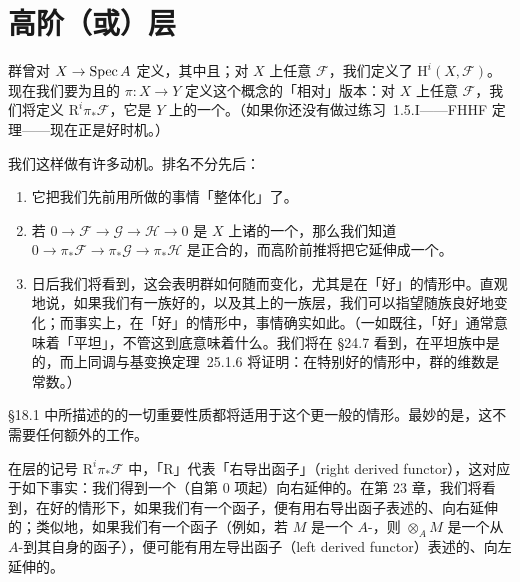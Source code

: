 
\section{高阶\trPushforward（或\trDirectImage）层}

\trCohomology{}群曾对 $X\to\operatorname{Spec} A$ 定义，其中\trStructureMorphism{}\trQuasicompact{}且\trSeparated；对 $X$ 上任意\trQCSheaf{} $\mathscr{F}$，我们定义了 $\mathrm{H}^i(X,\mathscr{F})$。现在我们要为\trQuasicompact{}且\trSeparated{}的\trMorphism{} $\pi\colon X\to Y$ 定义这个概念的「相对」版本：对 $X$ 上任意\trQCSheaf{} $\mathscr{F}$，我们将定义 $\mathrm{R}^i\pi_*\mathscr{F}$，它是 $Y$ 上的一个\trQCSheaf。（如果你还没有做过\mbox{练习~1.5.I}——FHHF 定理——现在正是好时机。）

我们这样做有许多动机。排名不分先后：
\begin{enumerate}[label=(\arabic*),leftmargin=2.6em,itemsep=2pt,topsep=3pt]
\item 它把我们先前用\trCohomology{}所做的事情「整体化」了。
\item 若 $0\to\mathscr{F}\to\mathscr{G}\to\mathscr{H}\to 0$ 是 $X$ 上诸\trQCSheaf{}的一个\trShortExactSequence，那么我们知道 $0\to\pi_*\mathscr{F}\to\pi_*\mathscr{G}\to\pi_*\mathscr{H}$ 是正合的，而高阶前推将把它延伸成一个\trLongExactSequence。
\item 日后我们将看到，这会表明\trCohomology{}群如何随\trFamily{}而变化，尤其是在「好」的情形中。直观地说，如果我们有一族好的\trVariety，以及其上的一族层，我们可以指望\trCohomology{}随族良好地变化；而事实上，在「好」的情形中，事情确实如此。（一如既往，「好」通常意味着「平坦」，不管这到底意味着什么。我们将在 \S24.7 看到，\trEulerCharacteristic{}在\trProper{}平坦族中是\trLocallyConstant{}的，而\mbox{上同调与基变换定理~25.1.6} 将证明：在特别好的情形中，\trCohomology{}群的维数是常数。）
\end{enumerate}

\S18.1 中所描述的\trCohomology{}的一切重要性质都将适用于这个更一般的情形。最妙的是，这不需要任何额外的工作。

在\trHigherPushforward{}层的记号 $\mathrm{R}^i\pi_*\mathscr{F}$ 中，「R」代表「右导出函子」（right derived functor），这对应于如下事实：我们得到一个（自第 $0$ 项起）向右延伸的\trCohomology\trLongExactSequence。在第 23 章，我们将看到，在好的情形下，如果我们有一个\trLeftExact{}函子，便有用右导出函子表述的、向右延伸的\trLongExactSequence；类似地，如果我们有一个\trRightExact{}函子（例如，若 $M$ 是一个 $A$-\trModule，则 $\otimes_A M$ 是一个从 $A$-\trModule\trCategory{}到其自身的\trRightExact{}函子），便可能有用左导出函子（left derived functor）表述的、向左延伸的\trLongExactSequence。


